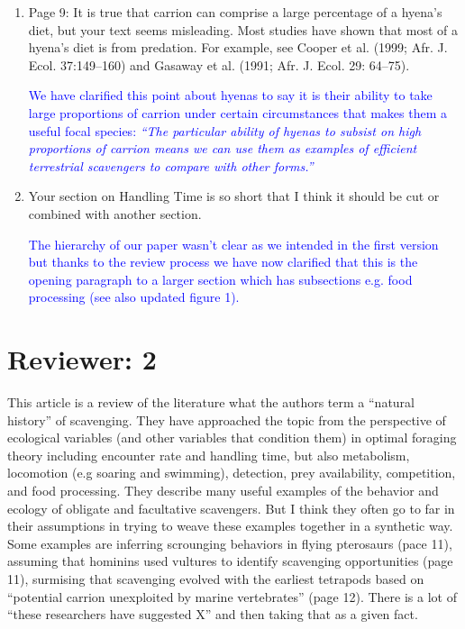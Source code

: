 \documentclass[12pt,letterpaper]{article}
\begin{document}
\begin{enumerate}
\item{Page 9: It is true that carrion can comprise a large percentage of a hyena's diet, but your text seems misleading. Most studies have shown that most of a hyena's diet is from predation. For example, see Cooper et al. (1999; Afr. J. Ecol. 37:149–160) and Gasaway et al. (1991; Afr. J. Ecol. 29: 64–75).}

\textcolor{blue}{We have clarified this point about hyenas to say it is their ability to take large proportions of carrion under certain circumstances that makes them a useful focal species: \textit{``The particular ability of hyenas to subsist on high proportions of carrion means we can use them as examples of efficient terrestrial scavengers to compare with other forms.''}}

\item{Your section on Handling Time is so short that I think it should be cut or combined with another section.}

\textcolor{blue}{The hierarchy of our paper wasn't clear as we intended in the first version but thanks to the review process we have now clarified that this is the opening paragraph to a larger section which has subsections e.g. food processing (see also updated figure 1).} 

\end{enumerate}

\section{Reviewer: 2}
This article is a review of the literature what the authors term a ``natural history'' of scavenging.
They have approached the topic from the perspective of ecological variables (and other variables that condition them) in optimal foraging theory including encounter rate and handling time, but also metabolism, locomotion (e.g soaring and swimming), detection, prey availability, competition, and food processing.
They describe many useful examples of the behavior and ecology of obligate and facultative scavengers.
But I think they often go to far in their assumptions in trying to weave these examples together in a synthetic way.
Some examples are inferring scrounging behaviors in flying pterosaurs (pace 11), assuming that hominins used vultures to identify scavenging opportunities (page 11), surmising that scavenging evolved with the earliest tetrapods based on ``potential carrion unexploited by marine vertebrates'' (page 12).
There is a lot of ``these researchers have suggested X'' and then taking that as a given fact.
\end{document}
